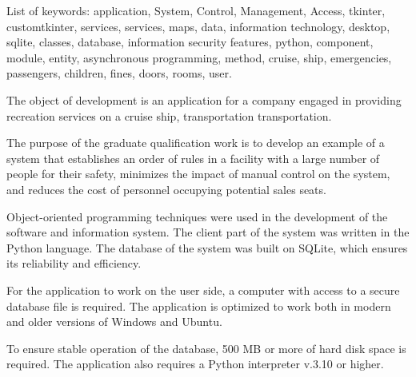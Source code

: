 List of keywords: application, System, Control, Management, Access, tkinter, customtkinter, services, services, maps, data, information technology, desktop, sqlite, classes, database, information security features, python, component, module, entity, asynchronous programming, method, cruise, ship, emergencies, passengers, children, fines, doors, rooms, user.

The object of development is an application for a company engaged in providing recreation services on a cruise ship, transportation transportation.

The purpose of the graduate qualification work is to develop an example of a system that establishes an order of rules in a facility with a large number of people for their safety, minimizes the impact of manual control on the system, and reduces the cost of personnel occupying potential sales seats.

Object-oriented programming techniques were used in the development of the software and information system. The client part of the system was written in the Python language. The database of the system was built on SQLite, which ensures its reliability and efficiency.

For the application to work on the user side, a computer with access to a secure database file is required. The application is optimized to work both in modern and older versions of Windows and Ubuntu.

To ensure stable operation of the database, 500 MB or more of hard disk space is required. The application also requires a Python interpreter v.3.10 or higher.
